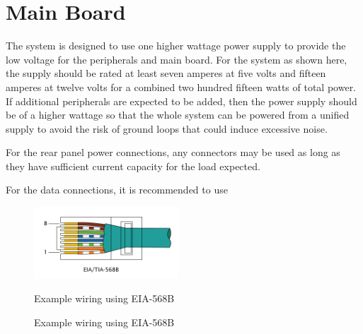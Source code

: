 \documentclass{book}
\begin{document}
\chapter{Main Board}
The system is designed to use one higher wattage power supply to provide the low voltage for the peripherals and main board. For the system as shown here, the supply should be rated at least seven amperes at five volts and fifteen amperes at twelve volts for a combined two hundred fifteen watts of total power. If additional peripherals are expected to be added, then the power supply should be of a higher wattage so that the whole system can be powered from a unified supply to avoid the risk of ground loops that could induce excessive noise.

For the rear panel power connections, any connectors may be used as long as they have sufficient current capacity for the load expected. 

For the data connections, it is recommended to use 

\begin{figure}
  \begin{center}
    \includegraphics[width=0.48\textwidth]{RJ-45_TIA-568B_Left.png}
  \end{center}
  \caption{Example wiring using EIA-568B}{Example wiring using EIA-568B\cite{img:eia568}\label{fig:eia568}}
\end{figure}
\end{document}
